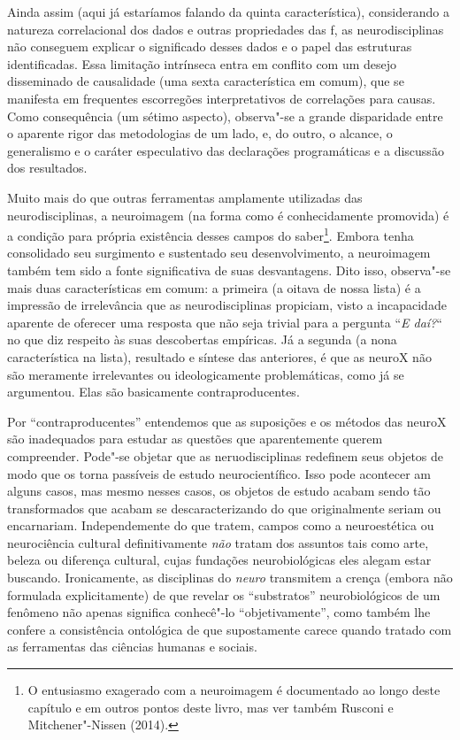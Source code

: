 Ainda assim (aqui já estaríamos falando da quinta característica),
considerando a natureza correlacional dos dados e outras propriedades
das f, as neurodisciplinas não conseguem explicar o significado
desses dados e o papel das estruturas identificadas. Essa limitação
intrínseca entra em conflito com um desejo disseminado de causalidade
(uma sexta característica em comum), que se manifesta em frequentes
escorregões interpretativos de correlações para causas. Como
consequência (um sétimo aspecto), observa"-se a grande disparidade entre
o aparente rigor das metodologias de um lado, e, do outro, o alcance, o
generalismo e o caráter especulativo das declarações programáticas e a
discussão dos resultados.

Muito mais do que outras ferramentas amplamente utilizadas das
neurodisciplinas, a neuroimagem (na forma como é conhecidamente
promovida) é a condição para própria existência desses campos do
saber\footnote[3]{O entusiasmo exagerado com a neuroimagem é documentado ao longo
deste capítulo e em outros pontos deste livro, mas ver também Rusconi e
Mitchener"-Nissen (2014).}. Embora tenha consolidado seu surgimento e
sustentado seu desenvolvimento, a neuroimagem também tem sido a fonte
significativa de suas desvantagens. Dito isso, observa"-se mais duas
características em comum: a primeira (a oitava de nossa lista) é a
impressão de irrelevância que as neurodisciplinas propiciam, visto a
incapacidade aparente de oferecer uma resposta que não seja trivial para
a pergunta ``\emph{E daí?}`` no que diz respeito às suas descobertas
empíricas. Já a segunda (a nona característica na lista), resultado e
síntese das anteriores, é que as neuroX não são meramente irrelevantes
ou ideologicamente problemáticas, como já se argumentou. Elas são
basicamente contraproducentes.

Por ``contraproducentes'' entendemos que as suposições e os métodos das
neuroX são inadequados para estudar as questões que aparentemente querem
compreender. Pode"-se objetar que as neruodisciplinas redefinem seus
objetos de modo que os torna passíveis de estudo neurocientífico. Isso
pode acontecer am alguns casos, mas mesmo nesses casos, os objetos de
estudo acabam sendo tão transformados que acabam se descaracterizando do
que originalmente seriam ou encarnariam. Independemente do que tratem,
campos como a neuroestética ou neurociência cultural definitivamente
\emph{não} tratam dos assuntos tais como arte, beleza ou diferença
cultural, cujas fundações neurobiológicas eles alegam estar buscando.
Ironicamente, as disciplinas do \emph{neuro} transmitem a crença (embora
não formulada explicitamente) de que revelar os ``substratos''
neurobiológicos de um fenômeno não apenas significa conhecê"-lo
``objetivamente'', como também lhe confere a consistência ontológica de
que supostamente carece quando tratado com as ferramentas das ciências
humanas e sociais.

